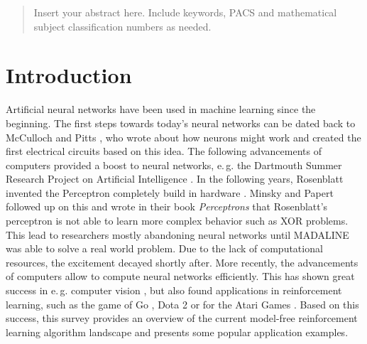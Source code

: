     \date{Received: date / Accepted: date}

    \maketitle
    \begin{abstract}
        Insert your abstract here. Include keywords, PACS and mathematical
        subject classification numbers as needed.
    \end{abstract}

    \section{Introduction \label{sec:intro}}
    Artificial neural networks have been used in machine learning since the beginning. 
    The first steps towards today's neural networks can be dated back to McCulloch and Pitts \cite{McCulloch1943}, who wrote about how neurons might work and created the first electrical circuits based on this idea.
    The following advancements of computers provided a boost to neural networks, e.\,g. the Dartmouth Summer Research Project on Artificial Intelligence \cite{McCarthy2006}.
    In the following years, Rosenblatt invented the Perceptron completely build in hardware \cite{Rosenblatt1958}.  
    Minsky and Papert followed up on this and wrote in their book \textit{Perceptrons} \cite{Minsky2017} that Rosenblatt's perceptron is not able to learn more complex behavior such as XOR problems.
    This lead to researchers mostly abandoning neural networks until MADALINE \cite{Winter1988} was able to solve a real world problem.
    Due to the lack of computational resources, the excitement decayed shortly after.
    More recently, the advancements of computers allow to compute neural networks efficiently.
    This has shown great success in e.\,g. computer vision \cite{Krizhevsky2012,He2016}, but also found applications in reinforcement learning, such as the game of Go \cite{Silver2017}, Dota 2 \cite{OpenAI2018} or for the Atari Games \cite{Mnih2015}.
    Based on this success, this survey provides an overview of the current model-free reinforcement learning algorithm landscape and presents some popular application examples.
    
